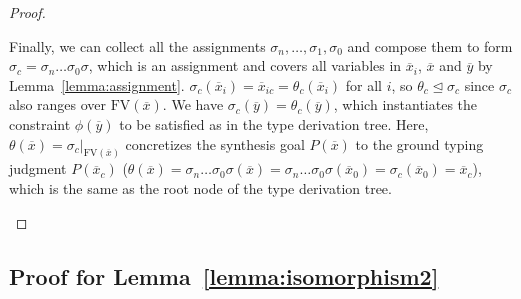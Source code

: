 \documentclass[manuscript,screen]{acmart}
\newcommand{\mvhzc}{\text{FV}}
\begin{document}
\begin{proof}
\begin{itemize}
    \emergencystretch=0pt Finally, we can collect all the assignments $\sigma_n, \ldots, \sigma_1, \sigma_0$ and compose them to form $\sigma_c = \sigma_n \ldots \sigma_0\sigma$, which is an assignment and covers all variables in $\overline{x}_i$, $\overline{x}$ and $\overline{y}$ by Lemma~\ref{lemma:assignment}. $\sigma_c(\overline{x}_i)=\overline{x}_{ic}=\theta_c(\overline{x}_i)$ for all $i$, so $\theta_c \trianglelefteq \sigma_c$ since $\sigma_c$ also ranges over $\mvhzc(\overline{x})$.
    We have $\sigma_c(\overline{y}) = \theta_c(\overline{y})$, which instantiates the constraint $\phi(\overline{y})$ to be satisfied as in the type derivation tree.    {\color{revblue}Here, } $\theta(\overline{x}) = \sigma_c|_{\mvhzc(\overline{x})}$ concretizes the synthesis goal $P(\overline{x})$ to the ground typing judgment $P(\overline{x}_c)$ ($\theta(\overline{x})=\sigma_n \ldots \sigma_0\sigma(\overline{x})=\sigma_n \ldots \sigma_0\sigma(\overline{x}_0)=\sigma_c(\overline{x}_0)=\overline{x}_c$), which is the same as the root node of the type derivation tree.
  \end{itemize}
\end{proof}

\subsection{Proof for Lemma~\ref{lemma:isomorphism2}}
\label{sec:appendix-lemma4}
\end{document}
